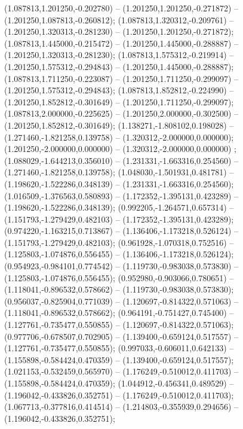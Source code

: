  (1.087813,1.201250,-0.202780) -- (1.201250,1.201250,-0.271872) -- (1.201250,1.087813,-0.260812);
 (1.087813,1.320312,-0.209761) -- (1.201250,1.320313,-0.281230) -- (1.201250,1.201250,-0.271872);
 (1.087813,1.445000,-0.215472) -- (1.201250,1.445000,-0.288887) -- (1.201250,1.320313,-0.281230);
 (1.087813,1.575312,-0.219914) -- (1.201250,1.575312,-0.294843) -- (1.201250,1.445000,-0.288887);
 (1.087813,1.711250,-0.223087) -- (1.201250,1.711250,-0.299097) -- (1.201250,1.575312,-0.294843);
 (1.087813,1.852812,-0.224990) -- (1.201250,1.852812,-0.301649) -- (1.201250,1.711250,-0.299097);
 (1.087813,2.000000,-0.225625) -- (1.201250,2.000000,-0.302500) -- (1.201250,1.852812,-0.301649);
 (1.138271,-1.808102,0.198028) -- (1.271460,-1.821258,0.139758) -- (1.320312,-2.000000,0.000000);
 (1.201250,-2.000000,0.000000) -- (1.320312,-2.000000,0.000000) ;
 (1.088029,-1.644213,0.356010) -- (1.231331,-1.663316,0.254560) -- (1.271460,-1.821258,0.139758);
 (1.048030,-1.501931,0.481781) -- (1.198620,-1.522286,0.348139) -- (1.231331,-1.663316,0.254560);
 (1.016509,-1.376563,0.580893) -- (1.172352,-1.395131,0.423289) -- (1.198620,-1.522286,0.348139);
 (0.992205,-1.264571,0.657314) -- (1.151793,-1.279429,0.482103) -- (1.172352,-1.395131,0.423289);
 (0.974220,-1.163215,0.713867) -- (1.136406,-1.173218,0.526124) -- (1.151793,-1.279429,0.482103);
 (0.961928,-1.070318,0.752516) -- (1.125803,-1.074876,0.556455) -- (1.136406,-1.173218,0.526124);
 (0.954923,-0.984101,0.774542) -- (1.119730,-0.983038,0.573830) -- (1.125803,-1.074876,0.556455);
 (0.952980,-0.903066,0.780651) -- (1.118041,-0.896532,0.578662) -- (1.119730,-0.983038,0.573830);
 (0.956037,-0.825904,0.771039) -- (1.120697,-0.814322,0.571063) -- (1.118041,-0.896532,0.578662);
 (0.964191,-0.751427,0.745400) -- (1.127761,-0.735477,0.550855) -- (1.120697,-0.814322,0.571063);
 (0.977706,-0.678507,0.702905) -- (1.139400,-0.659124,0.517557) -- (1.127761,-0.735477,0.550855);
 (0.997033,-0.606011,0.642133) -- (1.155898,-0.584424,0.470359) -- (1.139400,-0.659124,0.517557);
 (1.021153,-0.532459,0.565970) -- (1.176249,-0.510012,0.411703) -- (1.155898,-0.584424,0.470359);
 (1.044912,-0.456341,0.489529) -- (1.196042,-0.433826,0.352751) -- (1.176249,-0.510012,0.411703);
 (1.067713,-0.377816,0.414514) -- (1.214803,-0.355939,0.294656) -- (1.196042,-0.433826,0.352751);
